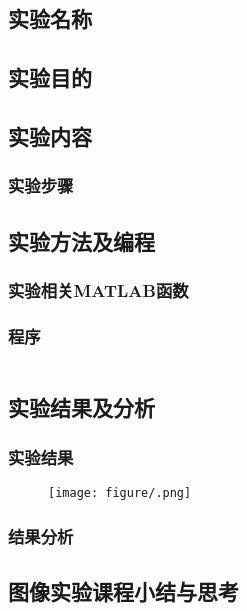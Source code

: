 \begin{center}
\chapter{}
\end{center}
\section{实验名称}
\section{实验目的}
\begin{itemize}
\end{itemize}
\section{实验内容}
\subsection{实验步骤}
\begin{itemize}
\end{itemize}
\section{实验方法及编程}
\subsection{实验相关MATLAB函数}

\subsection{程序}
\begin{lstlisting}

\end{lstlisting}
\section{实验结果及分析}
\subsection{实验结果}
\begin{figure}[H]
\centering
\texttt{[image: figure/.png]}
\end{figure}
\subsection{结果分析}


\begin{center}
\chapter{图像实验课程小结与思考}
\end{center}

